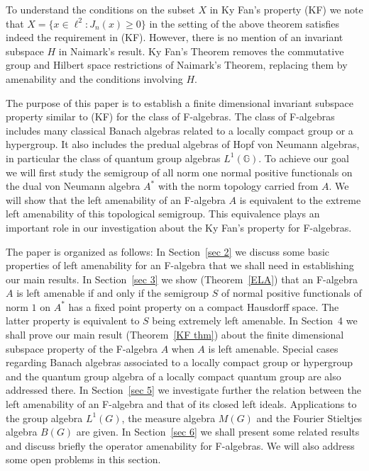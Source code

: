 \documentclass{tran-l}
\numberwithin{equation}{section}
\theoremstyle{definition}
\theoremstyle{remark}
\begin{document}
To understand the conditions on the subset $X$ in Ky Fan's property (KF) we note that $X=\{x\in \ell^2: J_n(x)\geq0\}$ in the setting of the above theorem satisfies indeed the requirement in (KF). However, there is no mention of an invariant subspace $H$ in Naimark's result. Ky Fan's Theorem removes the commutative group and Hilbert space restrictions of Naimark's Theorem, replacing them by amenability and the conditions involving $H$.

The purpose of this paper is to establish a finite dimensional invariant subspace property similar to (KF) for the class of F-algebras. The class of F-algebras includes many classical Banach algebras related to a locally compact group or a hypergroup. It also includes the predual algebras of Hopf von Neumann algebras, in particular the class of quantum group algebras $L^1({\mathbb G})$. To achieve our goal we will first study the semigroup of all norm one normal positive functionals on the dual von Neumann algebra $A^*$ with the norm topology carried from $A$. We will show that the left amenability of an F-algebra $A$ is equivalent to 
the extreme left amenability of this topological semigroup. This equivalence plays an important role in our investigation about the Ky Fan's property for F-algebras.

The paper is organized as follows: In Section~\ref{sec 2} we discuss some basic properties of left amenability for an F-algebra that we shall need in establishing our main results. In Section~\ref{sec 3} we show (Theorem~\ref{ELA}) that an F-algebra $A$ is left amenable if and only if the semigroup $S$ of normal positive functionals of norm $1$ on $A^*$ has a fixed point property on a compact Hausdorff space. The latter property is equivalent to $S$ being extremely left amenable. In Section~4 we shall prove our main result (Theorem~\ref{KF thm}) about the finite dimensional subspace property of the F-algebra $A$ when $A$ is left amenable. Special cases regarding Banach algebras associated to a locally compact group or hypergroup and the quantum group algebra of a locally compact quantum group are also addressed there. In Section~\ref{sec 5} we investigate further the relation between the left amenability of an F-algebra and that of its closed left ideals. Applications to the group algebra $L^1(G)$, the measure algebra $M(G)$ and the Fourier Stieltjes algebra $B(G)$ are given. In Section~\ref{sec 6} we shall present some related results and discuss briefly the operator amenability for F-algebras. We will also address some open problems in this section.
\end{document}
